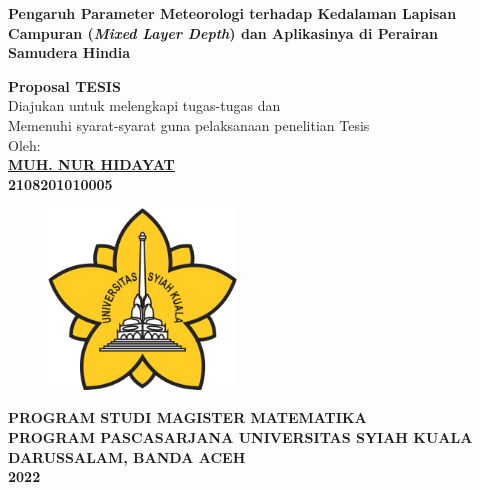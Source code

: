 \begin{spacing}{1}
	\begin{center}
		{\Large\textbf{Pengaruh Parameter Meteorologi terhadap Kedalaman Lapisan Campuran (\textit{Mixed Layer Depth}) dan Aplikasinya di Perairan Samudera Hindia}}\\[1.0cm]
	\end{center}
	\vspace*{0.8cm} 
	
	\begin{center}
		
		\large{\textbf{Proposal TESIS}}
		\\\vspace*{1.8cm}    
		\normalsize{Diajukan untuk melengkapi tugas-tugas dan \\
			Memenuhi syarat-syarat guna pelaksanaan penelitian Tesis}\\[1.5cm]
		\vspace*{1cm}  
		{\large Oleh:}\\
		\vspace*{1cm}       
		\large{\textbf{\underline{MUH. NUR HIDAYAT}}}
		\\\large{\textbf{2108201010005}} 
	\end{center}\vspace*{1cm}   
	
	\begin{figure}[h]
		\centering
		\includegraphics[width=5cm]{contents/USK} %
	\end{figure}
	\vspace*{1.5cm}   
	
	\begin{center}
		\textbf{PROGRAM STUDI MAGISTER MATEMATIKA \\
			PROGRAM PASCASARJANA UNIVERSITAS SYIAH KUALA\\
			DARUSSALAM, BANDA ACEH\\
			2022}
	\end{center}
	\thispagestyle{empty}
\end{spacing}